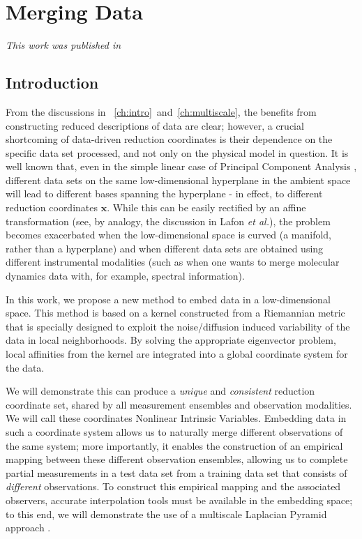 \chapter{Merging Data\label{ch:merging}}

\graphicspath{{ch-merging/figures/}}

{\em This work was published in \citep{dsilva2013nonlinear}}

\section{Introduction}

From the discussions in \chap~\ref{ch:intro}~and~\ref{ch:multiscale}, the benefits from constructing reduced descriptions of data are clear; however, a crucial shortcoming of
 data-driven reduction coordinates is their dependence on the specific data set processed,
and not only on the physical model in question.
%
It is well known that, even in the simple linear case of Principal Component Analysis \cite{jolliffe2005principal},
different data sets on the same low-dimensional hyperplane in the ambient space
will lead to different bases spanning the hyperplane - in effect, to different reduction coordinates $\mathbf{x}$.
%
While this can be easily rectified by an affine transformation
(see, by analogy, the discussion in Lafon {\em et al.}\cite{lafon2006data}),
the problem becomes
exacerbated when the low-dimensional space is curved (a manifold, rather than a hyperplane)
and when different data sets are obtained using different instrumental modalities
(such as when one wants to merge molecular dynamics data with, for example, spectral information).
%

In this work, we propose a new method to embed data in a low-dimensional space.
%
This method is based on a kernel constructed from a Riemannian metric that is specially designed to exploit the noise/diffusion induced variability of the data in local neighborhoods.
%
By solving the appropriate eigenvector problem, local affinities from the kernel are integrated into a global coordinate system for the data.

We will demonstrate this can produce a {\em unique} and {\em consistent} reduction
coordinate set, shared by all measurement ensembles and observation modalities.
%
We will call these coordinates Nonlinear Intrinsic Variables.
%
Embedding data in such a coordinate system allows us to naturally merge different observations of the same system;
more importantly, it enables the construction of an empirical mapping between these different
observation ensembles, allowing us to complete partial measurements in a test data set from a training data set
that consists of {\em different} observations.
%
To construct this empirical mapping and the associated observers,
accurate interpolation tools must be available in the embedding space; to this
end, we will demonstrate the use of a multiscale Laplacian Pyramid approach \cite{rabin2012heterogeneous}.

